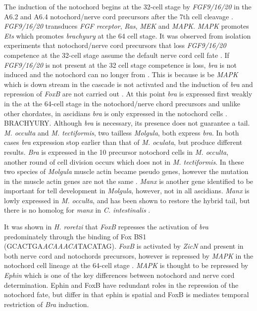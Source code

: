 The induction of the notochord begins at the 32-cell stage by \textit{FGF9/16/20} in the A6.2 and A6.4 notochord/nerve cord precursors after the 7th cell cleavage \cite{satoh_ascidian_2001}. \textit{FGF9/16/20} transduces \textit{FGF receptor}, \textit{Ras}, \textit{MEK} and \textit{MAPK}. \textit{MAPK} promotes \textit{Ets} which promotes \textit{brachyury} at the 64 cell stage. It was observed from isolation experiments that notochord/nerve cord precursors that loss \textit{FGF9/16/20} competence at the 32-cell stage assume the default nerve cord cell fate \cite{yasuo_conservation_1998,minokawa_binary_2001}. If \textit{FGF9/16/20} is not present at the 32 cell stage competence is loss, \textit{bra} is not induced and the notochord can no longer from \cite{nakatani_basic_1996,nakatani_duration_1999}. This is because is be \textit{MAPK} which is down stream in the cascade is not activated and the induction of \textit{bra} and repression of \textit{FoxB} are not carried out \cite{hashimoto_transcription_2011}. At this point \textit{bra} is expressed first weakly in the at the 64-cell stage in the notochord/nerve chord precursors \cite{yasuo_ascidian_1994} and unlike other chordates, in ascidians \textit{bra} is only expressed in the notochord cells \cite{yasuo_function_1993,corbo_characterization_1997,hotta_temporal_1999,takada_brachyury_2002}. BRACHYURY. Although \textit{bra} is necessary, its presence does not guarantee a tail. \textit{M. occulta} and \textit{M. tectiformis}, two tailless \textit{Molgula}, both express \textit{bra}. In both cases \textit{bra} expression stop earlier than that of \textit{M. oculata}, but produce different results. \textit{Bra} is expressed in the 10 precursor notochord cells in \textit{M. occulta}, another round of cell division occurs which does not in \textit{M. tectiformis}.  In these two species of \textit{Molgula} muscle actin became pseudo genes, however the mutation in the muscle actin genes are not the same \cite{swalla_novel_1993,jeffery_evolution_1999}. \textit{Manx} is another gene identified to be important for tell development in \textit{Molgula}, however, not in all ascidians. \textit{Manx} is lowly expressed in \textit{M. occulta}, and has been shown to restore the hybrid tail, but there is no homolog for \textit{manx} in \textit{C. intestinalis} \cite{swalla_requirement_1996,swalla_multigene_1999}. 
 
It was shown in \textit{H. roretzi} that \textit{FoxB} represses the activation of \textit{bra} predominately through the binding of Fox BS1 (GCACTGA\textit{ACAAACA}TACATAG). \textit{FoxB} is activated by \textit{ZicN} and present in both nerve cord and notochords precursors, however is repressed by \textit{MAPK} in the notochord cell lineage at the 64-cell stage \cite{hashimoto_transcription_2011}. \textit{MAPK} is thought to be repressed by \textit{Ephin} which is one of the key differences between notochord and nerve cord determination. Ephin and FoxB have redundant roles in the repression of the notochord fate, but differ in that ephin is spatial and FoxB is mediates temporal restriction of \textit{Bra} induction.
   
